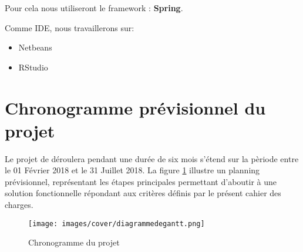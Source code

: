   Pour cela nous utiliseront le framework : \textbf{Spring}.
  
  Comme IDE, nous travaillerons sur:
  \begin{itemize}
      \item Netbeans
      \item RStudio
  \end{itemize}

\section{Chronogramme prévisionnel du projet}
Le projet de déroulera pendant une durée de six mois s'étend sur la pèriode entre le 01 Février 2018 et le 31 Juillet 2018. La figure \ref{ch} illustre un planning prévisionnel, représentant les étapes principales permettant d'aboutir à une solution fonctionnelle répondant aux critères définis par le présent cahier des charges.
\begin{figure}[h]
\centering
\texttt{[image: images/cover/diagrammedegantt.png]}
\caption{Chronogramme du projet}
\label{ch}
\end{figure}